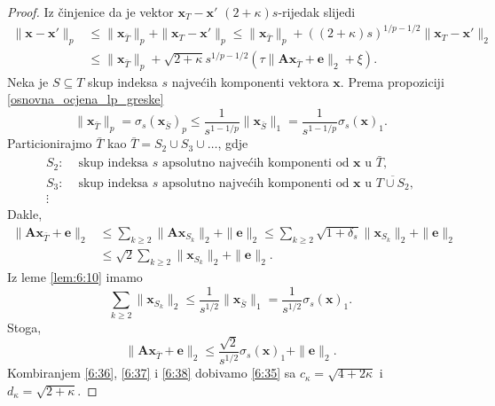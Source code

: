\documentclass[a4paper,twoside,12pt]{memoir} %
\newcommand{\vect}[1]{\mathbf{#1}}
\renewcommand{\vec}{\vect}
\newcommand{\norm}[1]{\|{#1}\|}
\begin{document}
\begin{proof}
    Iz \v{c}injenice da je vektor $\vec x_T - \vec x'$ $(2+\kappa)s$-rijedak slijedi
    \begin{align}
        \norm{\vec x - \vec x'}_p & \leq \norm{\vec x_{\bar T}}_p + \norm{\vec x_T - \vec x'}_p \leq \norm{\vec x_{\bar T}}_p + ((2+ \kappa)s)^{1/p-1/2} \norm{\vec x_T - \vec x'}_2 \nonumber  \\[0.5em]
        & \leq \norm{\vec x_{\bar T}}_p + \sqrt{2+ \kappa}s^{1/p - 1/2}(\tau \norm{\vec{Ax}_{\bar T} + \vec e}_2 + \xi). \label{6:36}
    \end{align}
    Neka je $S \subseteq T$ skup indeksa $s$ najve\'cih komponenti vektora $\vec x$. Prema propoziciji \ref{osnovna_ocjena_lp_greske}
    \begin{equation}\label{6:37}
        \norm{\vec x_{\bar T}}_p = \sigma_s(\vec x_{\bar S})_p \leq \frac{1}{s^{1-1/p}} \norm{\vec x_{\bar S}}_1 = \frac{1}{s^{1 - 1/p}} \sigma_s(\vec x)_1.  
    \end{equation}
    Particionirajmo $\bar T$ kao $\bar T = S_2 \cup S_3 \cup \dots$, gdje
    \begin{align*}
        S_2:& \text{ skup indeksa $s$ apsolutno najve\'cih komponenti od $\vec x$ u $\bar T$},\\[0.5em]
        S_3:& \text{ skup indeksa $s$ apsolutno najve\'cih komponenti od $\vec x$ u $\overline{T \cup S_2}$},\\[0.5em]
        \vdots
    \end{align*}
    Dakle,
    \begin{align*}
        \norm{\vec{Ax}_{\bar T} + \vec e}_2 & \leq \sum_{k \geq 2} \norm{\vec{Ax}_{S_k}}_2 + \norm{\vec e}_2 \leq \sum_{k \geq 2} \sqrt{1+\delta_s} \norm{\vec x_{S_k}}_2 + \norm{\vec e}_2 \\[0.5em]
        & \leq \sqrt{2} \sum_{k \geq 2} \norm{\vec x_{S_k}}_2 + \norm{\vec e}_2.
    \end{align*}
    Iz leme \ref{lem:6:10} imamo
    \begin{equation*}
        \sum_{k \geq 2} \norm{\vec x_{S_k}}_2 \leq \frac{1}{s^{1/2}} \norm{\vec x_{\bar S}}_1 = \frac{1}{s^{1/2}} \sigma_s(\vec x)_1.  
    \end{equation*}
    Stoga,
    \begin{equation}\label{6:38}
        \norm{\vec{Ax}_{\bar T} + \vec e}_2 \leq \frac{\sqrt{2}}{s^{1/2}} \sigma_s(\vec x)_1 + \norm{\vec e}_2. 
    \end{equation}
    Kombiranjem \eqref{6:36}, \eqref{6:37} i \eqref{6:38} dobivamo \eqref{6:35} sa $c_{\kappa} = \sqrt{4+2 \kappa}$ i $d_{\kappa} = \sqrt{2 + \kappa}$.
\end{proof}
\end{document}
